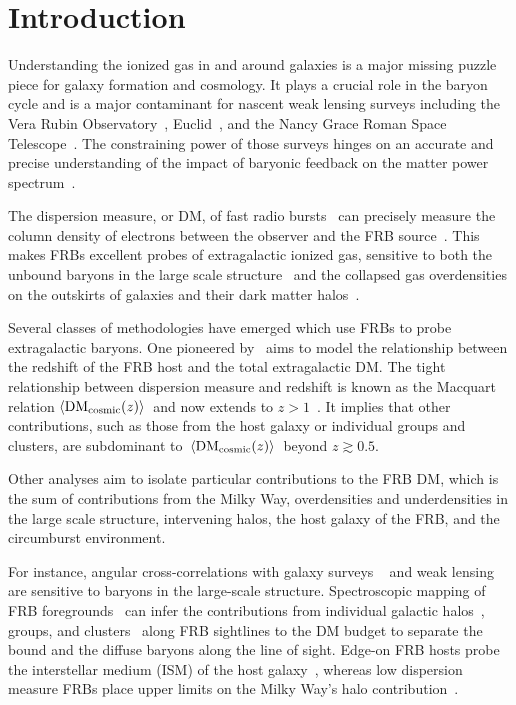 \documentclass[twocolumn,linenumbers]{aastex631}
\newcommand{\avgdmcosmic}{\ensuremath{\langle {\rm DM}_{\rm cosmic}(z) \rangle}}
\begin{document}
\section{Introduction}\label{sec:intro}
Understanding the ionized gas in and around galaxies is a major missing puzzle piece for galaxy formation and cosmology. It plays a crucial role in the baryon cycle and is a major contaminant for nascent weak lensing surveys including the Vera Rubin Observatory~\citep{lsst2009science}, Euclid~\citep{euclid2025overview}, and the Nancy Grace Roman Space Telescope~\citep{spergel2015wide}. The constraining power of those surveys hinges on an accurate and precise understanding of the impact of baryonic feedback on the matter power spectrum~\citep[for example]{white2004baryons, zhan2004effect, rudd2008effects}.

The dispersion measure, or DM, of fast radio bursts~\citep{petroff2019fast,cordes2019fast,petroff2022fast} can precisely measure the column density of electrons between the observer and the FRB source~\citep{lorimer2004handbook}. 
This makes FRBs excellent probes of extragalactic ionized gas, sensitive to both the unbound baryons in the large scale structure~\citep{masui2015dispersion,madhavacheril2019cosmology} and the collapsed gas overdensities on the outskirts of galaxies and their dark matter halos~\citep{mcquinn2014locating,prochaska2019probing}.

Several classes of methodologies have emerged which use FRBs to probe extragalactic baryons. 
One pioneered by~\citet{macquart2020census} aims to model the relationship between the redshift of the FRB host and the total extragalactic DM. The tight relationship between dispersion measure and redshift is known as the Macquart relation \avgdmcosmic\ and now extends to $z > 1$~\citep{connor2024gas}. It implies that other contributions, such as those from the host galaxy or individual groups and clusters, are subdominant to~\avgdmcosmic\ beyond $z \gtrsim 0.5$.

Other analyses aim to isolate particular contributions to the FRB DM, which is the sum of contributions from the Milky Way, overdensities and underdensities in the large scale structure, intervening halos, the host galaxy of the FRB, and the circumburst environment.

For instance, angular cross-correlations with galaxy surveys ~\citep{shirasaki2017large, madhavacheril2019cosmology,rafiei_ravandi2021chime,shirasaki2022probing,hsu2025decoding,wang2025measurement} and weak lensing~\citep{nicola2022breaking,reischke2023calibrating} are sensitive to baryons in the large-scale structure. Spectroscopic mapping of FRB foregrounds~\citep{lee2022constraining,lee2023frb,simha2020disentangling,simha2021estimating,khrykin2024flimflam,huang2025frb} can infer the contributions from individual galactic halos~\citep{prochaska2019probing}, groups, and clusters~\citep{connor2023deep} along FRB sightlines to the DM budget to separate the bound and the diffuse baryons along the line of sight. Edge-on FRB hosts probe the interstellar medium (ISM) of the host galaxy~\citep{cassanelli2024fast}, whereas low dispersion measure FRBs place upper limits on the Milky Way's halo contribution~\citep{cook2023frb,ravi2025deep}.
\end{document}
